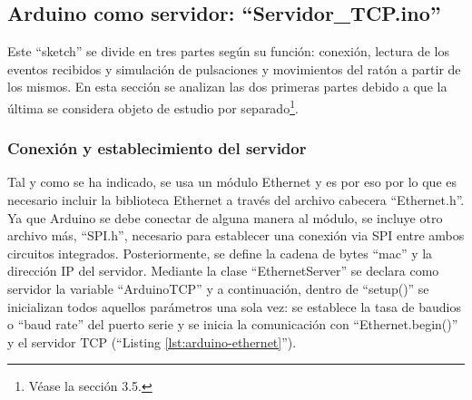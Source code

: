 \subsection{Arduino como servidor: ``Servidor\_TCP.ino''} \label{s3_5_2}

Este ``sketch'' se divide en tres partes según su función: conexión, lectura de los eventos recibidos y simulación de pulsaciones y movimientos del ratón a partir de los mismos. En esta sección se analizan las dos primeras partes debido a que la última se considera objeto de estudio por separado\footnote{Véase la sección 3.5.}.

\subsubsection{Conexión y establecimiento del servidor}\label{s3_5_2_1}

Tal y como se ha indicado, se usa un módulo Ethernet y es por eso por lo que es necesario incluir la biblioteca Ethernet a través del archivo cabecera ``Ethernet.h''. Ya que Arduino se debe conectar de alguna manera al módulo, se incluye otro archivo más, ``SPI.h'', necesario para establecer una conexión via SPI entre ambos circuitos integrados. Posteriormente, se define la cadena de bytes ``mac'' y la dirección IP del servidor. Mediante la clase ``EthernetServer'' se declara como servidor la variable ``ArduinoTCP'' y a continuación, dentro de ``setup()'' se inicializan todos aquellos parámetros una sola vez: se establece la tasa de baudios o ``baud rate'' del puerto serie y se inicia la comunicación con ``Ethernet.begin()'' y el servidor TCP (``Listing \ref{lst:arduino-ethernet}'').



